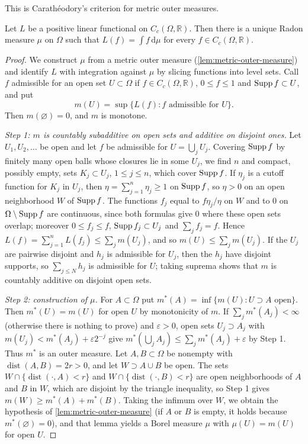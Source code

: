 This is Carath\'eodory's criterion for metric outer measures.

\begin{theorem}\label{thm:positive-functional-measure}
Let $L$ be a positive linear functional on $C_c(\Omega,\mathbb R)$. Then there is a unique Radon measure $\mu$ on $\Omega$ such that $L(f)=\int f\,\mathrm d\mu$ for every $f\in C_c(\Omega,\mathbb R)$.
\end{theorem}
\begin{proof}
We construct $\mu$ from a metric outer measure (\cref{lem:metric-outer-measure}) and identify $L$ with integration against $\mu$ by slicing functions into level sets. Call $f$ admissible for an open set $U\subset\Omega$ if $f\in C_c(\Omega,\mathbb R)$, $0\leq f\leq1$ and $\operatorname{Supp} f\subset U$, and put
\[
 m(U)=\sup\{L(f):f\text{ admissible for }U\}.
\]
Then $m(\varnothing)=0$, and $m$ is monotone.

\emph{Step 1: $m$ is countably subadditive on open sets and additive on disjoint ones.} Let $U_1,U_2,\ldots$ be open and let $f$ be admissible for $U=\bigcup_jU_j$. Covering $\operatorname{Supp} f$ by finitely many open balls whose closures lie in some $U_j$, we find $n$ and compact, possibly empty, sets $K_j\subset U_j$, $1\leq j\leq n$, which cover $\operatorname{Supp} f$. If $\eta_j$ is a cutoff function for $K_j$ in $U_j$, then $\eta=\sum_{j=1}^n\eta_j\geq1$ on $\operatorname{Supp} f$, so $\eta>0$ on an open neighborhood $W$ of $\operatorname{Supp} f$. The functions $f_j$ equal to $f\eta_j/\eta$ on $W$ and to $0$ on $\Omega\setminus\operatorname{Supp} f$ are continuous, since both formulas give $0$ where these open sets overlap; moreover $0\leq f_j\leq f$, $\operatorname{Supp} f_j\subset U_j$ and $\sum_jf_j=f$. Hence $L(f)=\sum_{j=1}^nL(f_j)\leq\sum_jm(U_j)$, and so $m(U)\leq\sum_jm(U_j)$. If the $U_j$ are pairwise disjoint and $h_j$ is admissible for $U_j$, then the $h_j$ have disjoint supports, so $\sum_{j\leq N}h_j$ is admissible for $U$; taking suprema shows that $m$ is countably additive on disjoint open sets.

\emph{Step 2: construction of $\mu$.} For $A\subset\Omega$ put $m^*(A)=\inf\{m(U):U\supset A\text{ open}\}$. Then $m^*(U)=m(U)$ for open $U$ by monotonicity of $m$. If $\sum_jm^*(A_j)<\infty$ (otherwise there is nothing to prove) and $\varepsilon>0$, open sets $U_j\supset A_j$ with $m(U_j)<m^*(A_j)+\varepsilon2^{-j}$ give $m^*(\bigcup_jA_j)\leq\sum_jm^*(A_j)+\varepsilon$ by Step 1. Thus $m^*$ is an outer measure. Let $A,B\subset\Omega$ be nonempty with $\operatorname{dist}(A,B)=2r>0$, and let $W\supset A\cup B$ be open. The sets $W\cap\{\operatorname{dist}(\cdot,A)<r\}$ and $W\cap\{\operatorname{dist}(\cdot,B)<r\}$ are open neighborhoods of $A$ and $B$ in $W$, which are disjoint by the triangle inequality, so Step 1 gives $m(W)\geq m^*(A)+m^*(B)$. Taking the infimum over $W$, we obtain the hypothesis of \cref{lem:metric-outer-measure} (if $A$ or $B$ is empty, it holds because $m^*(\varnothing)=0$), and that lemma yields a Borel measure $\mu$ with $\mu(U)=m(U)$ for open $U$.


\end{proof}
